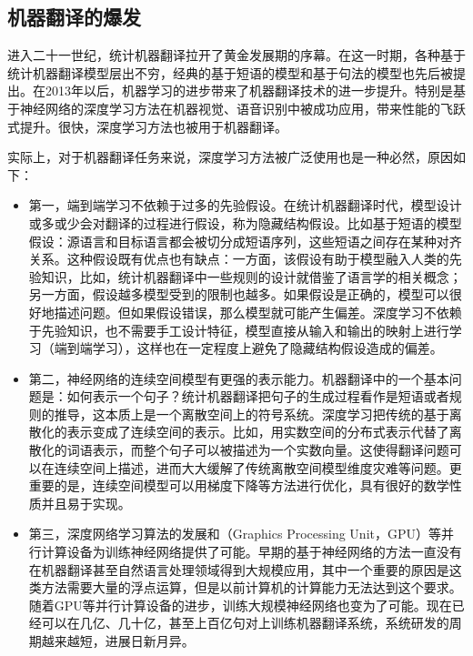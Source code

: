 
\subsection{机器翻译的爆发}

\parinterval 进入二十一世纪，统计机器翻译拉开了黄金发展期的序幕。在这一时期，各种基于统计机器翻译模型层出不穷，经典的基于短语的模型和基于句法的模型也先后被提出。在2013年以后，机器学习的进步带来了机器翻译技术的进一步提升。特别是基于神经网络的深度学习方法在机器视觉、语音识别中被成功应用，带来性能的飞跃式提升。很快，深度学习方法也被用于机器翻译。

\parinterval 实际上，对于机器翻译任务来说，深度学习方法被广泛使用也是一种必然，原因如下：

\begin{itemize}
\vspace{0.5em}
\item 第一，端到端学习不依赖于过多的先验假设。在统计机器翻译时代，模型设计或多或少会对翻译的过程进行假设，称为隐藏结构假设。比如基于短语的模型假设：源语言和目标语言都会被切分成短语序列，这些短语之间存在某种对齐关系。这种假设既有优点也有缺点：一方面，该假设有助于模型融入人类的先验知识，比如，统计机器翻译中一些规则的设计就借鉴了语言学的相关概念；另一方面，假设越多模型受到的限制也越多。如果假设是正确的，模型可以很好地描述问题。但如果假设错误，那么模型就可能产生偏差。深度学习不依赖于先验知识，也不需要手工设计特征，模型直接从输入和输出的映射上进行学习（端到端学习），这样也在一定程度上避免了隐藏结构假设造成的偏差。
\vspace{0.5em}
\item 第二，神经网络的连续空间模型有更强的表示能力。机器翻译中的一个基本问题是：如何表示一个句子？统计机器翻译把句子的生成过程看作是短语或者规则的推导，这本质上是一个离散空间上的符号系统。深度学习把传统的基于离散化的表示变成了连续空间的表示。比如，用实数空间的分布式表示代替了离散化的词语表示，而整个句子可以被描述为一个实数向量。这使得翻译问题可以在连续空间上描述，进而大大缓解了传统离散空间模型维度灾难等问题。更重要的是，连续空间模型可以用梯度下降等方法进行优化，具有很好的数学性质并且易于实现。
\vspace{0.5em}
\item 第三，深度网络学习算法的发展和{\small{}}（Graphics Processing Unit，GPU）等并行计算设备为训练神经网络提供了可能。早期的基于神经网络的方法一直没有在机器翻译甚至自然语言处理领域得到大规模应用，其中一个重要的原因是这类方法需要大量的浮点运算，但是以前计算机的计算能力无法达到这个要求。随着GPU等并行计算设备的进步，训练大规模神经网络也变为了可能。现在已经可以在几亿、几十亿，甚至上百亿句对上训练机器翻译系统，系统研发的周期越来越短，进展日新月异。
\vspace{0.5em}
\end{itemize}

